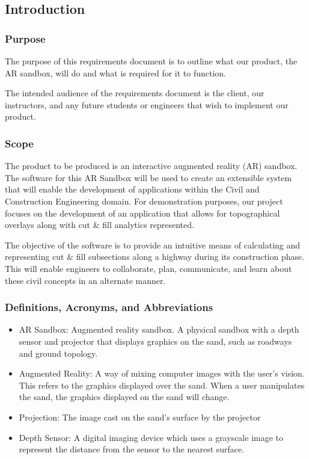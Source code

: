 
\subsection{Introduction}
\subsubsection{Purpose}
The purpose of this requirements document is to outline what our product, the AR sandbox, will do and what is required for it to function.
\par The intended audience of the requirements document is the client, our instructors, and any future students or engineers that wish to implement our product.
\subsubsection{Scope}
The product to be produced is an interactive augmented reality (AR) sandbox. The software for this AR Sandbox will be used to create an extensible system that will enable the development of applications within the Civil and Construction Engineering domain.  For demonstration purposes, our project focuses on the development of an application that allows for topographical overlays along with cut \& fill analytics represented.
\par The objective of the software is to provide an intuitive means of calculating and representing cut \& fill subsections along a highway during its construction phase.  This will enable engineers to collaborate, plan, communicate, and learn about these civil concepts in an alternate manner.
\subsubsection{Definitions, Acronyms, and Abbreviations}
\begin{itemize}
\item AR Sandbox: Augmented reality sandbox. A physical sandbox with a depth sensor and projector that displays graphics on the sand, such as roadways and ground topology.
\item Augmented Reality: A way of mixing computer images with the user's vision. This refers to the graphics displayed over the sand. When a user manipulates the sand, the graphics displayed on the sand will change.
\item Projection: The image cast on the sand's surface by the projector
\item Depth Sensor: A digital imaging device which uses a grayscale image to represent the distance from the sensor to the nearest surface.
\end{itemize}
